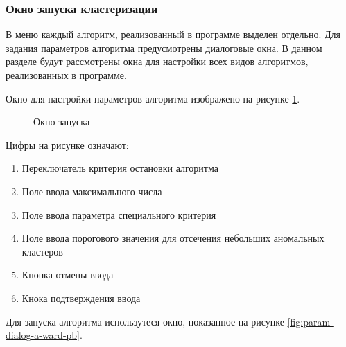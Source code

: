 \documentclass[12pt,tikz]{instruction}
\begin{document}
\subsubsection{Окно запуска кластеризации}
\label{subsubsec:run-clustering-dialog}
В меню каждый алгоритм, реализованный в программе выделен отдельно. Для задания параметров алгоритма предусмотрены диалоговые окна. В данном разделе будут рассмотрены окна для настройки всех видов алгоритмов, реализованных в программе. 

\textbf{\AWard}

Окно для настройки параметров алгоритма \AWard изображено на рисунке \ref{fig:param-dialog-a-ward}.
\begin{figure}[H]
	\centering
	\caption{Окно запуска \AWard}
	\label{fig:param-dialog-a-ward}
\end{figure}

Цифры на рисунке означают:
\begin{enumerate}
	\item Переключатель критерия остановки алгоритма
	\item Поле ввода максимального числа 
	\item Поле ввода параметра специального критерия
	\item Поле ввода порогового значения для отсечения небольших аномальных кластеров
	\item Кнопка отмены ввода
	\item Кнока подтверждения ввода
\end{enumerate}

\textbf{\AWardpb}

Для запуска алгоритма \AWardpb использутеся окно, показанное на рисунке \ref{fig:param-dialog-a-ward-pb}.
\end{document}
